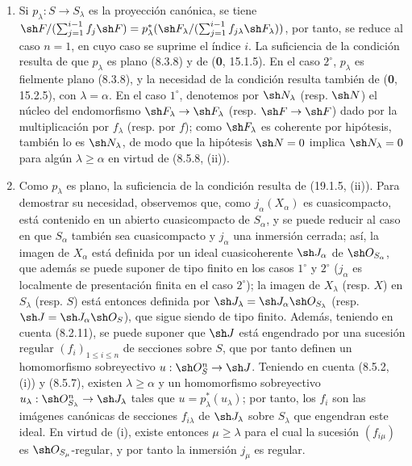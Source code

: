 \begin{enumerate}
  \item[(i)] Si $p_\lambda:S\to S_\lambda$ es la proyección canónica, se tiene
  $\sh F/(\sum_{j=1}^{i-1}f_j\sh F)=p_\lambda^*(\sh F_\lambda/(\sum_{j=1}^{i-1}f_{j\lambda}\sh F_\lambda))$,
  por tanto, se reduce al caso $n=1$, en cuyo caso se suprime el índice $i$. La suficiencia de la condición resulta de que $p_\lambda$ es plano (8.3.8) y de (\textbf{0}, 15.1.5). En el caso $2^\circ$, $p_\lambda$ es fielmente plano (8.3.8), y la necesidad de la condición resulta también de (\textbf{0}, 15.2.5), con $\lambda=\alpha$. En el caso $1^\circ$, denotemos por $\sh N_\lambda$ (resp. $\sh N$) el núcleo del endomorfismo $\sh F_\lambda\to\sh F_\lambda$ (resp. $\sh F\to\sh F$) dado por la multiplicación por $f_\lambda$ (resp. por $f$); como $\sh F_\lambda$ es coherente por hipótesis, también lo es $\sh N_\lambda$, de modo que la hipótesis $\sh N=0$ implica $\sh N_\lambda=0$ para algún $\lambda\geq\alpha$ en virtud de (8.5.8, (ii)).
  \item[(ii)] Como $p_\lambda$ es plano, la suficiencia de la condición resulta de (19.1.5, (ii)). Para demostrar su necesidad, observemos que, como $j_\alpha(X_\alpha)$ es cuasicompacto, está contenido en un abierto cuasicompacto de $S_\alpha$, y se puede reducir al caso en que $S_\alpha$ también sea cuasicompacto y $j_\alpha$ una inmersión cerrada; así, la imagen de $X_\alpha$ está definida por un ideal cuasicoherente $\sh J_\alpha$ de $\sh O_{S_\alpha}$, que además se puede suponer de tipo finito en los casos $1^\circ$ y $2^\circ$ ($j_\alpha$ es localmente de presentación finita en el caso $2^\circ$); la imagen de $X_\lambda$ (resp. $X$) en $S_\lambda$ (resp. $S$) está entonces definida por $\sh J_\lambda=\sh J_\alpha\sh O_{S_\lambda}$ (resp. $\sh J=\sh J_\alpha\sh O_S$), que sigue siendo de tipo finito. Además, teniendo en cuenta (8.2.11), se puede suponer que $\sh J$ está engendrado por una sucesión regular $(f_i)_{1\leq i\leq n}$ de secciones sobre $S$, que por tanto definen un homomorfismo sobreyectivo $u:\sh O_S^n\to\sh J$. Teniendo en cuenta (8.5.2, (i)) y (8.5.7), existen $\lambda\geq\alpha$ y un homomorfismo sobreyectivo $u_\lambda:\sh O_{S_\lambda}^n\to\sh J_\lambda$ tales que $u=p_\lambda^*(u_\lambda)$; por tanto, los $f_i$ son las imágenes canónicas de secciones $f_{i\lambda}$ de $\sh J_\lambda$ sobre $S_\lambda$ que engendran este ideal. En virtud de (i), existe entonces $\mu\geq\lambda$ para el cual la sucesión $(f_{i\mu})$ es $\sh O_{S_\mu}$-regular, y por tanto la inmersión $j_\mu$ es regular.
\end{enumerate}

